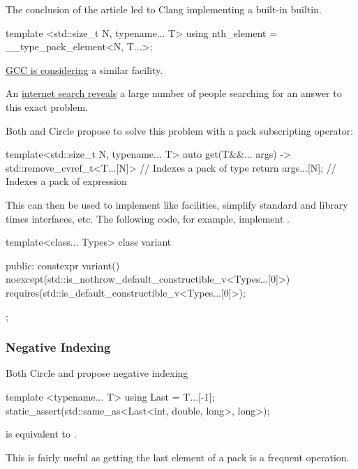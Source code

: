 \documentclass{wg21}
\begin{document}
The conclusion of the article led to Clang implementing a built-in  builtin.

\begin{colorblock}
template <std::size_t N, typename... T>
using nth_element = __type_pack_element<N, T...>;
\end{colorblock}

\href{https://gcc.gnu.org/bugzilla/show_bug.cgi?id=100157}{GCC is considering} a similar facility.

An \href{https://gcc.gnu.org/bugzilla/show_bug.cgi?id=100157}{internet search reveals} a large number of people searching for an answer to this exact problem.

Both  and Circle propose to solve this problem with a pack subscripting operator:

\begin{colorblock}
template<std::size_t N, typename... T>
auto get(T&&... args) -> std::remove_cvref_t<T...[N]> // Indexes a pack of type {
    return args...[N]; // Indexes a pack of expression
}
\end{colorblock}

This can then be used to implement  like facilities, simplify standard and library times interfaces, etc.
The following code, for example, implement .

\begin{colorblock}
template<class... Types>
class variant {
public:
    constexpr variant()
    noexcept(std::is_nothrow_default_constructible_v<Types...[0]>)
    requires(std::is_default_constructible_v<Types...[0]>);

};
\end{colorblock}

\subsubsection{Negative Indexing}

Both Circle and  propose negative indexing

\begin{colorblock}
template <typename... T>
using Last = T...[-1];
static_assert(std::same_as<Last<int, double, long>, long>);
\end{colorblock}

 is equivalent to .


This is fairly useful as getting the last element of a pack is a frequent operation.
\end{document}
